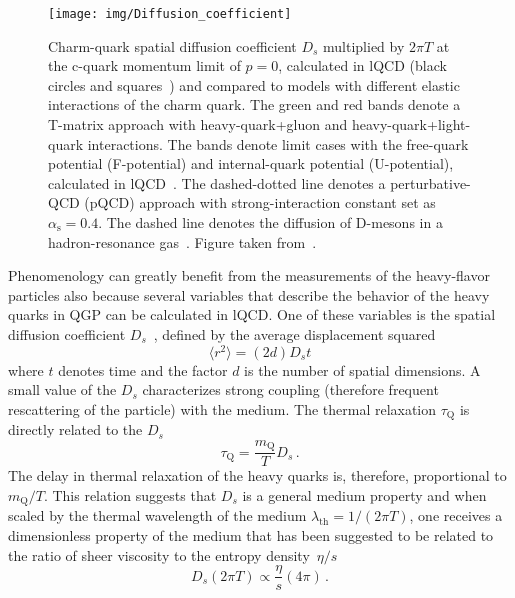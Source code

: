 \begin{figure}[!htb]
\begin{center}
 \texttt{[image: img/Diffusion\_coefficient]}
\caption{\label{diffusion}Charm-quark spatial diffusion coefficient $D_s$ multiplied by $2\pi T$ at the c-quark momentum limit of $p = 0$, calculated in lQCD (black circles and squares~\cite{BanerjeeLattice,DingLattice}) and compared to models with different elastic interactions of the charm quark. The green and red bands denote a T-matrix approach with heavy-quark+gluon and heavy-quark+light-quark interactions. The bands denote limit cases with the free-quark potential (F-potential) and internal-quark potential (U-potential), calculated in lQCD~\cite{Tmatrix}\@. The dashed-dotted line denotes a perturbative-QCD (pQCD) approach with strong-interaction constant set as $\alpha_\mathrm{s} = 0.4$\@. The dashed line denotes the diffusion of D-mesons in a hadron-resonance gas~\cite{DmesonHRG}\@. Figure taken from~\cite{summaryHF}.}
\end{center}
\end{figure}


Phenomenology can greatly benefit from the measurements of the heavy-flavor particles also because several variables that describe the behavior of the heavy quarks in QGP can be calculated in lQCD\@.  One of these variables is the spatial diffusion coefficient $D_s$~\cite{BanerjeeLattice,DingLattice}, defined by the average displacement squared
\begin{equation}
 \langle r^2 \rangle = (2d) D_s t
\end{equation}
where $t$ denotes time and the factor $d$ is the number of spatial dimensions. A small value of the $D_s$ characterizes strong coupling (therefore frequent rescattering of the particle) with the medium. The thermal relaxation $\tau_\mathrm{Q}$ is directly related to the $D_s$~\cite{Prino_Rapp_HF}
\begin{equation}
 \tau_\mathrm{Q} = \frac{m_\mathrm{Q}}{T} D_s\,.
\end{equation}
The delay in thermal relaxation of the heavy quarks is, therefore, proportional to $m_\mathrm{Q}/T$\@. This relation suggests that $D_s$ is a general medium property and when scaled by the thermal wavelength of the medium $\lambda_\mathrm{th} = 1/(2 \pi T)$, one receives a dimensionless property of the medium that has been suggested to be related to the ratio of sheer viscosity to the entropy density~$\eta/s$~\cite{heavyThermalizationAndEtaOverS,QGP4}
\begin{equation}
D_s(2\pi T) \propto \frac{\eta}{s} (4\pi)\,.
\end{equation}


